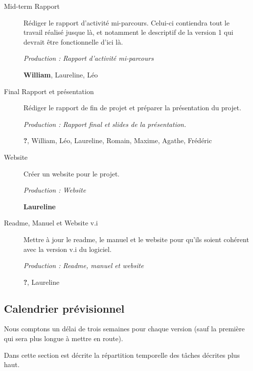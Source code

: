 \documentclass{article}
\begin{document}
\begin{description}
\begin{description}
  \item[Mid-term Rapport] Rédiger le rapport d'activité mi-parcours. Celui-ci contiendra tout le travail réalisé jusque là, et notamment le descriptif de la version 1 qui devrait être fonctionnelle d'ici là.

    \textit{Production : Rapport d'activité mi-parcours}

    \textbf{William}, Laureline, Léo

  \item[Final Rapport et présentation] Rédiger le rapport de fin de projet et préparer la présentation du projet.

    \textit{Production : Rapport final et slides de la présentation.}

    \textbf{?}, William, Léo, Laureline, Romain, Maxime, Agathe, Frédéric

  \item[Website] Créer un website pour le projet. %

    \textit{Production : Website}

    \textbf{Laureline}

  \item[Readme, Manuel et Website v.i] Mettre à jour le readme, le manuel et le website pour qu'ils soient cohérent avec la version v.i du logiciel.

    \textit{Production : Readme, manuel et website}

    \textbf{?}, Laureline
  \end{description}

\medskip

\end{description}


\subsection{Calendrier prévisionnel}

Nous comptons un délai de trois semaines pour chaque version (sauf la première qui sera plus longue à mettre en route).

Dans cette section est décrite la répartition temporelle des tâches décrites plus haut.


\newpage

\end{document}
